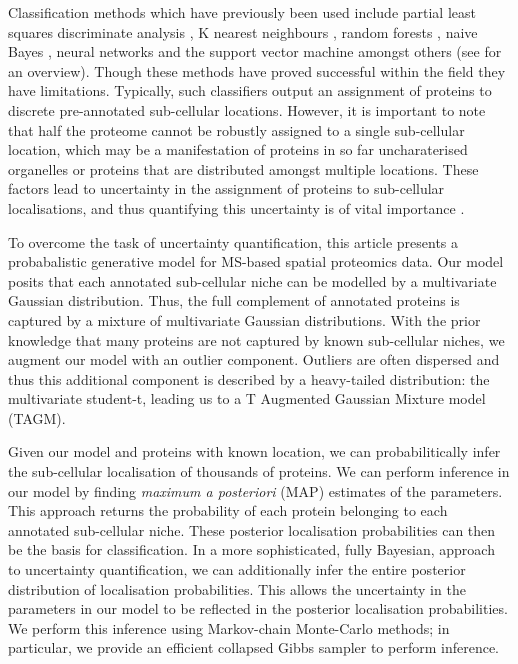 \documentclass[12pt,english]{article}
\begin{document}
Classification methods which have previously been used include partial
least squares discriminate analysis \citep{Dunkley:2006}, K nearest
neighbours \citep{Groen::2014}, random forests \citep{Ohta::2010},
naive Bayes \citep{Nikolovski::2012}, neural networks
\citep{Tardif::2012} and the support vector machine amongst others
(see \cite{Gatto:2014b} for an overview). Though these methods have
proved successful within the field they have limitations. Typically,
such classifiers output an assignment of proteins to discrete
pre-annotated sub-cellular locations. However, it is important to note
that half the proteome cannot be robustly assigned to a single
sub-cellular location, which may be a manifestation of proteins in so
far uncharaterised organelles or proteins that are distributed amongst
multiple locations. These factors lead to uncertainty in the
assignment of proteins to sub-cellular localisations, and thus
quantifying this uncertainty is of vital importance \citep{Kirk:2015}.

To overcome the task of uncertainty quantification, this article
presents a probabalistic generative model for MS-based spatial
proteomics data. Our model posits that each annotated sub-cellular
niche can be modelled by a multivariate Gaussian distribution. Thus,
the full complement of annotated proteins is captured by a mixture of
multivariate Gaussian distributions. With the prior knowledge that
many proteins are not captured by known sub-cellular niches, we
augment our model with an outlier component. Outliers are often
dispersed and thus this additional component is described by a
heavy-tailed distribution: the multivariate student-t, leading us to a
T Augmented Gaussian Mixture model (TAGM).

Given our model and proteins with known location, we can probabilitically infer the sub-cellular localisation of thousands of proteins. We can perform inference in our model by finding \textit{maximum a posteriori} (MAP) estimates of the parameters. This approach returns the probability of each protein belonging to each annotated sub-cellular niche. These posterior localisation probabilities can then be the basis for classification. In a more sophisticated, fully Bayesian, approach to uncertainty quantification, we can additionally infer the entire posterior distribution of
localisation probabilities. This allows the uncertainty in the parameters in our model to be reflected
in the posterior localisation probabilities. We perform this inference using Markov-chain Monte-Carlo methods;
in particular, we provide an efficient collapsed Gibbs sampler to perform inference.
\end{document}
